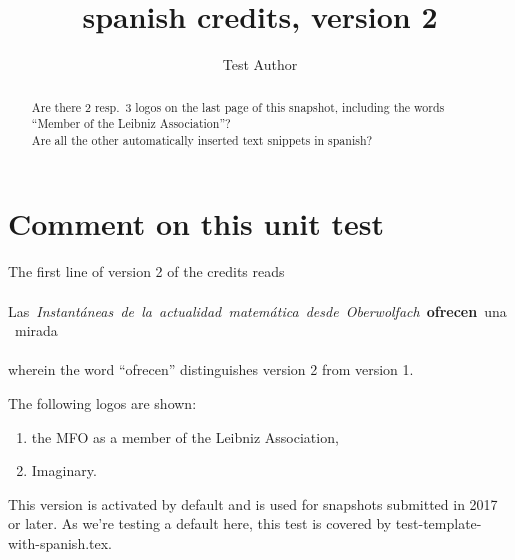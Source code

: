 \documentclass{snapshotmfo}
\author{Test Author}
\title{spanish credits, version 2}
\begin{document}
\begin{abstract}
Are there 2 resp.\ 3 logos on the last page of this snapshot, including the words ``Member of the Leibniz Association''?\\
Are all the other automatically inserted text snippets in spanish?
\end{abstract}

\section{Comment on this unit test}
The first line of version 2 of the credits reads\\
\\
\hbox{Las \emph{Instantáneas de la actualidad matemática desde Oberwolfach} \textbf{ofrecen} una mirada}\\
\\
wherein the word ``ofrecen'' distinguishes version 2 from version 1.

The following logos are shown:
\begin{enumerate}
  \item the MFO as a member of the Leibniz Association,
  \item Imaginary.
\end{enumerate}
This version is activated by default 
and is used for snapshots submitted in 2017 or later.
As we're testing a default here, this test is covered by test-template-with-spanish.tex.
\end{document}
